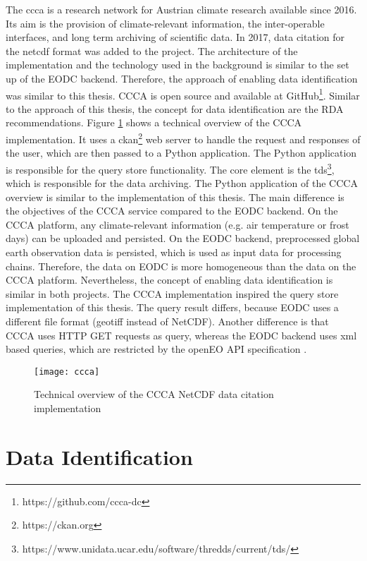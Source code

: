 \documentclass[draft,final]{vutinfth} %
\begin{document}
The \gls{ccca} is a research network for Austrian climate research available since 2016. Its aim is the provision of climate-relevant information, the inter-operable interfaces, and long term archiving of scientific data. In 2017, data citation for the \gls{netcdf} format was added to the project. The architecture of the implementation and the technology used in the background is similar to the set up of the EODC backend. Therefore, the approach of enabling data identification was similar to this thesis. CCCA is open source and available at GitHub\footnote{https://github.com/ccca-dc}. Similar to the approach of this thesis, the concept for data identification are the RDA recommendations. Figure \ref{fig:ccca} shows a technical overview of the CCCA implementation. It uses a ckan\footnote{https://ckan.org} web server to handle the request and responses of the user, which are then passed to a Python application. The Python application is responsible for the query store functionality. The core element is the \gls{tds}\footnote{https://www.unidata.ucar.edu/software/thredds/current/tds/}, which is responsible for the data archiving.   
The Python application of the CCCA overview is similar to the implementation of this thesis. The main difference is the objectives of the CCCA service compared to the EODC backend. On the CCCA platform, any climate-relevant information (e.g. air temperature or frost days) can be uploaded and persisted. On the EODC backend, preprocessed global earth observation data is persisted, which is used as input data for processing chains. Therefore, the data on EODC is more homogeneous than the data on the CCCA platform.
Nevertheless, the concept of enabling data identification is similar in both projects. The CCCA implementation inspired the query store implementation of this thesis. The query result differs, because EODC uses a different file format (\gls{geotiff} instead of NetCDF). Another difference is that CCCA uses HTTP GET requests as query, whereas the EODC backend uses \gls{xml} based queries, which are restricted by the openEO API specification \cite{ccca}.  

\begin{figure}[h]
	\centering
	\texttt{[image: ccca]}
	\caption{Technical overview of the CCCA NetCDF data citation implementation}
	\label{fig:ccca} %
\end{figure}

\section{Data Identification}\label{Data Identification}
\end{document}
